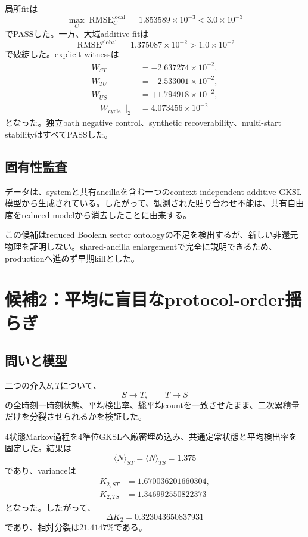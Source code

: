 \documentclass[11pt,a4paper,uplatex,dvipdfmx]{bxjsarticle}
\theoremstyle{remark}
\DeclareMathOperator{\RMSE}{RMSE}
\begin{document}
局所fitは
\begin{equation}
\max_C \RMSE_C^{\mathrm{local}}
=1.853589\times10^{-3}
<3.0\times10^{-3}
\end{equation}
でPASSした。一方、大域additive fitは
\begin{equation}
\RMSE^{\mathrm{global}}
=1.375087\times10^{-2}
>1.0\times10^{-2}
\end{equation}
で破綻した。explicit witnessは
\begin{align}
W_{ST}&=-2.637274\times10^{-2},\\
W_{TU}&=-2.533001\times10^{-2},\\
W_{US}&=+1.794918\times10^{-2},\\
\|W_{\mathrm{cycle}}\|_2&=4.073456\times10^{-2}
\end{align}
となった。独立bath negative control、synthetic recoverability、multi-start stabilityはすべてPASSした。

\subsection{固有性監査}

データは、systemと共有ancillaを含む一つのcontext-independent additive GKSL模型から生成されている。したがって、観測された貼り合わせ不能は、共有自由度をreduced modelから消去したことに由来する。

\begin{warningbox}[判定]
この候補はreduced Boolean sector ontologyの不足を検出するが、新しい非還元物理を証明しない。shared-ancilla enlargementで完全に説明できるため、productionへ進めず早期killとした。
\end{warningbox}

\section{候補2：平均に盲目なprotocol-order揺らぎ}

\subsection{問いと模型}

二つの介入$S,T$について、
\begin{equation}
S\to T,
\qquad
T\to S
\end{equation}
の全時刻一時刻状態、平均検出率、総平均countを一致させたまま、二次累積量だけを分裂させられるかを検証した。

4状態Markov過程を4準位GKSLへ厳密埋め込み、共通定常状態と平均検出率を固定した。結果は
\begin{equation}
\langle N\rangle_{ST}
=
\langle N\rangle_{TS}
=1.375
\end{equation}
であり、varianceは
\begin{align}
K_{2,ST}&=1.670036201660304,\\
K_{2,TS}&=1.346992550822373
\end{align}
となった。したがって、
\begin{equation}
\boxed{\Delta K_2=0.323043650837931}
\end{equation}
であり、相対分裂は$21.4147\%$である。
\end{document}
